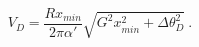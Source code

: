 \begin{equation}
V_D=\frac{Rx_{min}}{2\pi\alpha'}\sqrt{G^2 x_{min}^2+\Delta\theta_D^2}
\ .
\end{equation}

